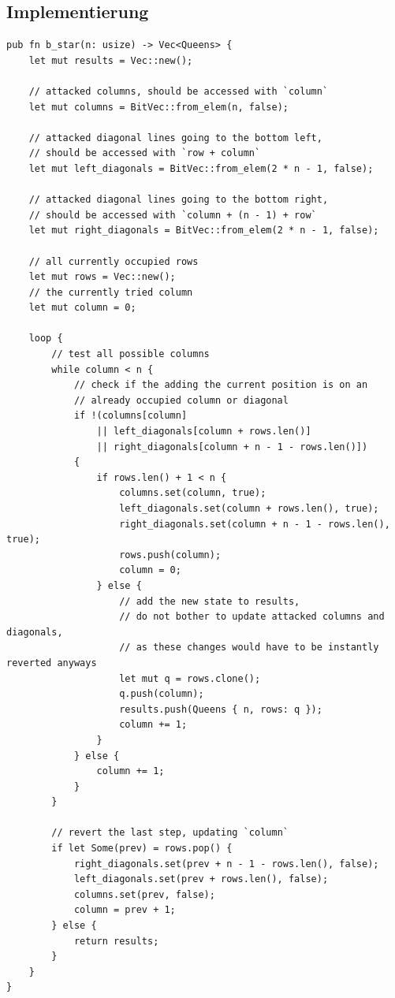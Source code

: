 \subsection{Implementierung}
\begin{verbatim}
pub fn b_star(n: usize) -> Vec<Queens> {
    let mut results = Vec::new();

    // attacked columns, should be accessed with `column`
    let mut columns = BitVec::from_elem(n, false);

    // attacked diagonal lines going to the bottom left,
    // should be accessed with `row + column`
    let mut left_diagonals = BitVec::from_elem(2 * n - 1, false);

    // attacked diagonal lines going to the bottom right,
    // should be accessed with `column + (n - 1) + row`
    let mut right_diagonals = BitVec::from_elem(2 * n - 1, false);

    // all currently occupied rows
    let mut rows = Vec::new();
    // the currently tried column
    let mut column = 0;

    loop {
        // test all possible columns
        while column < n {
            // check if the adding the current position is on an
            // already occupied column or diagonal
            if !(columns[column]
                || left_diagonals[column + rows.len()]
                || right_diagonals[column + n - 1 - rows.len()])
            {
                if rows.len() + 1 < n {
                    columns.set(column, true);
                    left_diagonals.set(column + rows.len(), true);
                    right_diagonals.set(column + n - 1 - rows.len(), true);
                    rows.push(column);
                    column = 0;
                } else {
                    // add the new state to results,
                    // do not bother to update attacked columns and diagonals,
                    // as these changes would have to be instantly reverted anyways
                    let mut q = rows.clone();
                    q.push(column);
                    results.push(Queens { n, rows: q });
                    column += 1;
                }
            } else {
                column += 1;
            }
        }

        // revert the last step, updating `column`
        if let Some(prev) = rows.pop() {
            right_diagonals.set(prev + n - 1 - rows.len(), false);
            left_diagonals.set(prev + rows.len(), false);
            columns.set(prev, false);
            column = prev + 1;
        } else {
            return results;
        }
    }
}
\end{verbatim}

